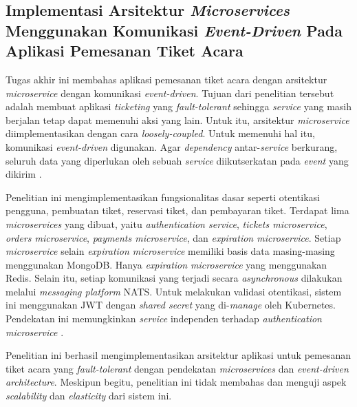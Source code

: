\subsection{Implementasi Arsitektur \textit{Microservices} Menggunakan Komunikasi \textit{Event-Driven} Pada Aplikasi Pemesanan Tiket Acara}

Tugas akhir ini membahas aplikasi pemesanan tiket acara dengan arsitektur \textit{microservice} dengan komunikasi \textit{event-driven}. Tujuan dari penelitian tersebut adalah membuat aplikasi \textit{ticketing} yang \textit{fault-tolerant} sehingga \textit{service} yang masih berjalan tetap dapat memenuhi aksi yang lain. Untuk itu, arsitektur \textit{microservice} diimplementasikan dengan cara \textit{loosely-coupled}. Untuk memenuhi hal itu, komunikasi \textit{event-driven} digunakan. Agar \textit{dependency} antar-\textit{service} berkurang, seluruh data yang diperlukan oleh sebuah \textit{service} diikutserkatan pada \textit{event} yang dikirim \parencite{microservicesEventDriven}.

Penelitian ini mengimplementasikan fungsionalitas dasar seperti otentikasi pengguna, pembuatan tiket, reservasi tiket, dan pembayaran tiket. Terdapat lima \textit{microservices} yang dibuat, yaitu \textit{authentication service}, \textit{tickets microservice}, \textit{orders microservice}, \textit{payments microservice}, dan \textit{expiration microservice}. Setiap \textit{microservice} selain \textit{expiration microservice} memiliki basis data masing-masing menggunakan MongoDB. Hanya \textit{expiration microservice} yang menggunakan Redis. Selain itu, setiap komunikasi yang terjadi secara \textit{asynchronous} dilakukan melalui \textit{messaging platform} NATS. Untuk melakukan validasi otentikasi, sistem ini menggunakan JWT dengan \textit{shared secret} yang di-\textit{manage} oleh Kubernetes. Pendekatan ini memungkinkan \textit{service} independen terhadap \textit{authentication microservice} \parencite{microservicesEventDriven}.

Penelitian ini berhasil mengimplementasikan arsitektur aplikasi untuk pemesanan tiket acara yang \textit{fault-tolerant} dengan pendekatan \textit{microservices} dan \textit{event-driven architecture}. Meskipun begitu, penelitian ini tidak membahas dan menguji aspek \textit{scalability} dan \textit{elasticity} dari sistem ini.